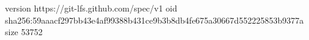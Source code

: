 version https://git-lfs.github.com/spec/v1
oid sha256:59aaacf297bb43e4af99388b431ce9b3b8db4fe675a30667d552225853b9377a
size 53752
